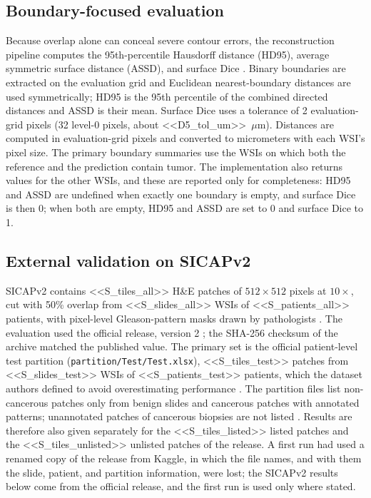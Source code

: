 \documentclass[10pt,letterpaper]{article}
\begin{document}
\subsection*{Boundary-focused evaluation}
Because overlap alone can conceal severe contour errors, the reconstruction pipeline computes the 95th-percentile Hausdorff distance (HD95), average symmetric surface distance (ASSD), and surface Dice \cite{bib42,bib43}. Binary boundaries are extracted on the evaluation grid and Euclidean nearest-boundary distances are used symmetrically; HD95 is the 95th percentile of the combined directed distances and ASSD is their mean. Surface Dice uses a tolerance of 2 evaluation-grid pixels (32 level-0 pixels, about <<D5_tol_um>>~$\mu$m). Distances are computed in evaluation-grid pixels and converted to micrometers with each WSI's pixel size. The primary boundary summaries use the WSIs on which both the reference and the prediction contain tumor. The implementation also returns values for the other WSIs, and these are reported only for completeness: HD95 and ASSD are undefined when exactly one boundary is empty, and surface Dice is then 0; when both are empty, HD95 and ASSD are set to 0 and surface Dice to 1.

\subsection*{External validation on SICAPv2}
SICAPv2 contains <<S_tiles_all>> H\&E patches of $512\times512$ pixels at $10\times$, cut with 50\% overlap from <<S_slides_all>> WSIs of <<S_patients_all>> patients, with pixel-level Gleason-pattern masks drawn by pathologists \cite{bib44,bib45}. The evaluation used the official release, version 2 \cite{bib44}; the SHA-256 checksum of the archive matched the published value. The primary set is the official patient-level test partition (\texttt{partition/Test/Test.xlsx}), <<S_tiles_test>> patches from <<S_slides_test>> WSIs of <<S_patients_test>> patients, which the dataset authors defined to avoid overestimating performance \cite{bib45}. The partition files list non-cancerous patches only from benign slides and cancerous patches with annotated patterns; unannotated patches of cancerous biopsies are not listed \cite{bib44,bib45}. Results are therefore also given separately for the <<S_tiles_listed>> listed patches and the <<S_tiles_unlisted>> unlisted patches of the release. A first run had used a renamed copy of the release from Kaggle, in which the file names, and with them the slide, patient, and partition information, were lost; the SICAPv2 results below come from the official release, and the first run is used only where stated.
\end{document}
